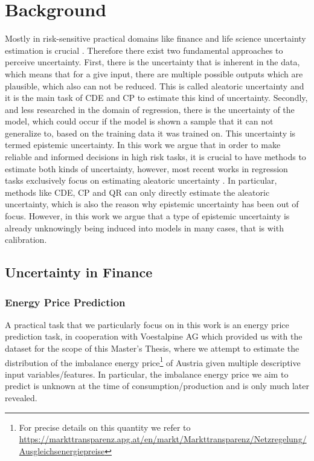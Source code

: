 \section{Background}\label{sec:background}

Mostly in risk-sensitive practical domains like finance and life science uncertainty estimation is crucial \cite{abdar2021review, xia2020uncertainty, ghesu2021quantifying, mashrur2020machine}. Therefore there exist two fundamental approaches to perceive uncertainty. First, there is the uncertainty that is inherent in the data, which means that for a give input, there are multiple possible outputs which are plausible, which also can not be reduced. This is called aleatoric uncertainty and it is the main task of CDE and CP to estimate this kind of uncertainty. Secondly, and less researched in the domain of regression, there is the uncertainty of the model, which could occur if the model is shown a sample that it can not generalize to, based on the training data it was trained on. This uncertainty is termed epistemic uncertainty. In this work we argue that in order to make reliable and informed decisions in high risk tasks, it is crucial to have methods to estimate both kinds of uncertainty, however, most recent works in regression tasks exclusively focus on estimating aleatoric uncertainty \cite{romano2019conformalized, sesia2020comparison, angelopoulos2021gentle,chernozhukov2021distributional,sesia2021conformal, oliveira2022split, romano2022conformal, izbicki2022cd, gupta2022nested, auer2024conformal}. In particular, methods like CDE, CP and QR can only directly estimate the aleatoric uncertainty, which is also the reason why epistemic uncertainty has been out of focus. However, in this work we argue that a type of epistemic uncertainty is already unknowingly being induced into models in many cases, that is with calibration.

\subsection{Uncertainty in Finance}\label{sec:intro_finance}

\subsubsection{Energy Price Prediction}

A practical task that we particularly focus on in this work is an energy price prediction task, in cooperation with Voestalpine AG which provided us with the dataset for the scope of this Master's Thesis, where we attempt to estimate the distribution of the imbalance energy price\footnote{For precise details on this quantity we refer to \url{https://markttransparenz.apg.at/en/markt/Markttransparenz/Netzregelung/Ausgleichsenergiepreise}} of Austria given multiple descriptive input variables/features. In particular, the imbalance energy price we aim to predict is unknown at the time of consumption/production and is only much later revealed.

